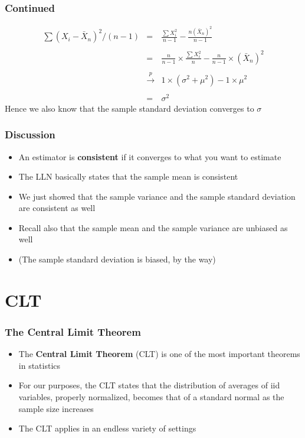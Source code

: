 \documentclass[aspectratio=169]{beamer}
\begin{document}
\begin{frame}\frametitle{Continued}
  \begin{eqnarray*}
    \sum (X_i - \bar X_n)^2 / (n - 1) & =  & \frac{\sum X_i^2}{n - 1}  - \frac{n (\bar X_n)^2}{n - 1}  \\ \\
    & = & \frac{n}{n-1}\times \frac{\sum X_i^2}{n} - \frac{n}{n-1} \times (\bar X_n)^ 2\\ \\
    & \stackrel{p}{\rightarrow} & 1 \times (\sigma^2 + \mu^2) - 1 \times \mu^2 \\ \\
    & = & \sigma^2 
  \end{eqnarray*}
  Hence we also know that the sample standard deviation converges to
  $\sigma$
\end{frame}

\begin{frame}\frametitle{Discussion}
  \begin{itemize}
  \item An estimator is {\bf consistent} if it converges to what you want to estimate
  \item The LLN basically states that the sample mean is consistent
  \item We just showed that the sample variance and the sample standard deviation are
    consistent as well
  \item Recall also that the sample mean and the sample variance are unbiased as well
  \item (The sample standard deviation is biased, by the way)
  \end{itemize}
\end{frame}

\section{CLT}
\begin{frame}\frametitle{The Central Limit Theorem}
  \begin{itemize}
  \item The {\bf Central Limit Theorem} (CLT) is one of the most important theorems in statistics
  \item For our purposes, the CLT states that the distribution of
    averages of iid variables, properly normalized, becomes that of a
    standard normal as the sample size increases
  \item The CLT applies in an endless variety of settings
  \end{itemize}
\end{frame}
\end{document}
